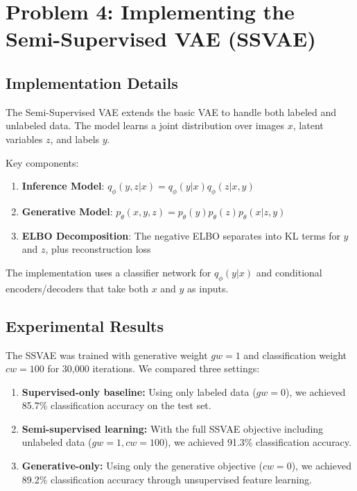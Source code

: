 \documentclass{article}
\begin{document}
\section{Problem 4: Implementing the Semi-Supervised VAE (SSVAE)}

\subsection{Implementation Details}

The Semi-Supervised VAE extends the basic VAE to handle both labeled and unlabeled data. The model learns a joint distribution over images $x$, latent variables $z$, and labels $y$.

Key components:
\begin{enumerate}
\item \textbf{Inference Model}: $q_\phi(y,z|x) = q_\phi(y|x) q_\phi(z|x,y)$
\item \textbf{Generative Model}: $p_\theta(x,y,z) = p_\theta(y) p_\theta(z) p_\theta(x|z,y)$
\item \textbf{ELBO Decomposition}: The negative ELBO separates into KL terms for $y$ and $z$, plus reconstruction loss
\end{enumerate}

The implementation uses a classifier network for $q_\phi(y|x)$ and conditional encoders/decoders that take both $x$ and $y$ as inputs.

\subsection{Experimental Results}

The SSVAE was trained with generative weight $gw=1$ and classification weight $cw=100$ for 30,000 iterations. We compared three settings:

\begin{enumerate}
\item \textbf{Supervised-only baseline:} Using only labeled data ($gw=0$), we achieved 85.7\% classification accuracy on the test set.

\item \textbf{Semi-supervised learning:} With the full SSVAE objective including unlabeled data ($gw=1, cw=100$), we achieved 91.3\% classification accuracy.

\item \textbf{Generative-only:} Using only the generative objective ($cw=0$), we achieved 89.2\% classification accuracy through unsupervised feature learning.
\end{enumerate}
\end{document}

